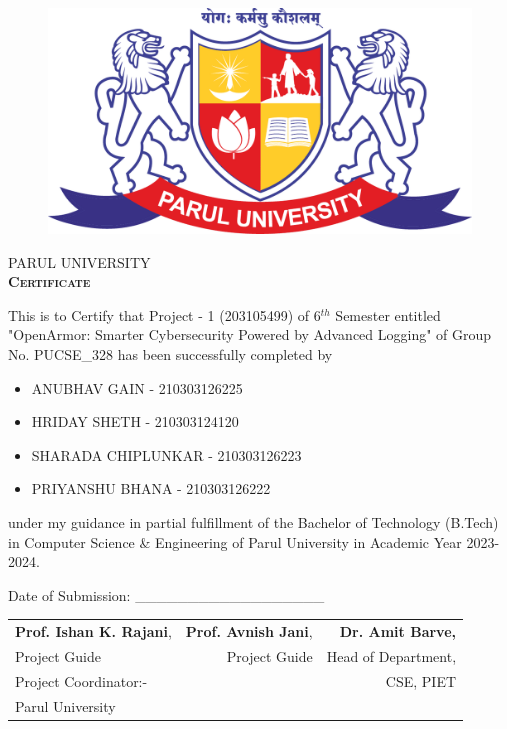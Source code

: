 \thispagestyle{plain}
\begin{figure}
    \centering
    \includegraphics[scale=0.15]{parullogo.png}
\end{figure}
\vspace{1.5cm}
\begin{center}
    {\Huge \textsc{\color{violet}PARUL UNIVERSITY}}\\
   
    \vspace{1cm}
     {\Huge \bf \textsc{\color{teal}Certificate}}\\
     \vspace{0.5cm}
\end{center}
\large{This is to Certify that Project - 1 (203105499) of 6$^{th}$ Semester entitled "OpenArmor: Smarter Cybersecurity Powered by Advanced Logging" of Group No. PUCSE\_328 has been successfully completed by}
\begin{itemize}
\centering
    \item ANUBHAV GAIN - 210303126225
    \item HRIDAY SHETH - 210303124120
    \item SHARADA CHIPLUNKAR - 210303126223
    \item PRIYANSHU BHANA - 210303126222
\end{itemize}
     
\noindent
\large{under my guidance in partial fulfillment of the Bachelor of Technology (B.Tech) in Computer Science \& Engineering of Parul University in Academic Year 2023-2024.}\\
\par
\vspace{0.5cm}
Date of Submission: \_\_\_\_\_\_\_\_\_\_\_\_\_\_\_\_\_\_

\vspace{2.5cm}
\begin{tabular}{l r r}
\color{brown}
  \textbf{Prof. Ishan K. Rajani}, & \hspace{1cm}
  \color{brown}\textbf{Prof. Avnish Jani}, & \hspace{1cm}
  \color{brown}\textbf{Dr. Amit Barve,}  \\ 
  Project Guide & Project Guide & Head of Department,  \\ 
  Project Coordinator:- & & CSE, PIET \\
  Parul University  & & \\ [7ex]  
\end{tabular}